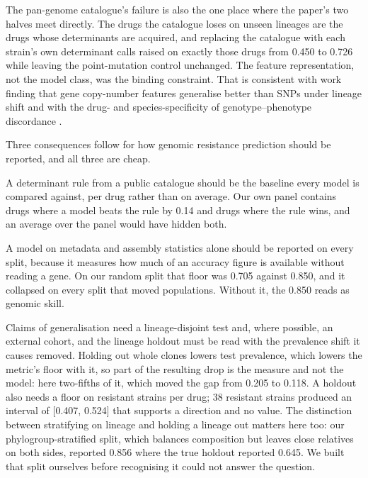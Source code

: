 The pan-genome catalogue's failure is also the one place where the paper's two halves meet
directly. The drugs the catalogue loses on unseen lineages are the drugs whose determinants are
acquired, and replacing the catalogue with each strain's own determinant calls raised \nap{} on
exactly those drugs from 0.450 to 0.726 while leaving the point-mutation control unchanged. The
feature representation, not the model class, was the binding constraint. That is consistent with
work finding that gene copy-number features generalise better than SNPs under lineage shift
\cite{fistarol2025copynumber} and with the drug- and species-specificity of genotype--phenotype
discordance \cite{cheon2026discordance}.

Three consequences follow for how genomic resistance prediction should be reported, and all three
are cheap.

A determinant rule from a public catalogue should be the baseline every model is compared against,
per drug rather than on average. Our own panel contains drugs where a model beats the rule by 0.14
and drugs where the rule wins, and an average over the panel would have hidden both.

A model on metadata and assembly statistics alone should be reported on every split, because it
measures how much of an accuracy figure is available without reading a gene. On our random split
that floor was 0.705 against 0.850, and it collapsed on every split that moved populations. Without
it, the 0.850 reads as genomic skill.

Claims of generalisation need a lineage-disjoint test and, where possible, an external cohort, and
the lineage holdout must be read with the prevalence shift it causes removed. Holding out whole
clones lowers test prevalence, which lowers the metric's floor with it, so part of the resulting
drop is the measure and not the model: here two-fifths of it, which moved the gap from 0.205 to
0.118. A holdout also needs a floor on resistant strains per drug; 38
resistant strains produced an interval of [0.407, 0.524] that supports a direction and no value. The
distinction between stratifying on lineage and holding a lineage out matters here too: our
phylogroup-stratified split, which balances composition but leaves close relatives on both sides,
reported 0.856 where the true holdout reported 0.645. We built that split ourselves before
recognising it could not answer the question.

